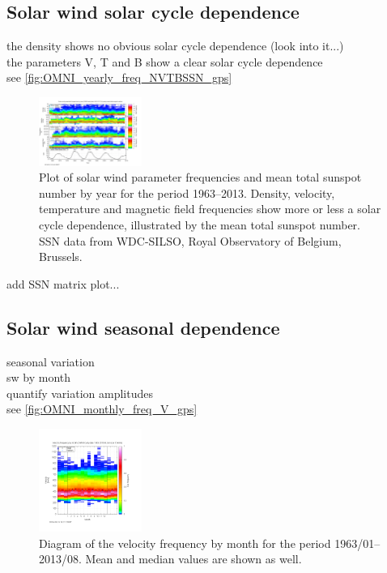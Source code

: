 \subsection{Solar wind solar cycle dependence}


the density shows no obvious solar cycle dependence (look into it...)\\
the parameters V, T and B show a clear solar cycle dependence\\
see \autoref{fig:OMNI_yearly_freq_NVTBSSN_gps}
\begin{figure}[htb]
	\centering
	\includegraphics[width=0.3\textwidth]{images/gnuplots/OMNI_yearly_freq_NVTBSSN_gps.png}
	\caption{Plot of solar wind parameter frequencies and mean total sunspot number by year for the period 1963--2013. Density, velocity, temperature and magnetic field frequencies show more or less a solar cycle dependence, illustrated by the mean total sunspot number. SSN data from WDC-SILSO, Royal Observatory of Belgium, Brussels.}
	\label{fig:OMNI_yearly_freq_NVTBSSN_gps}
\end{figure}
add SSN matrix plot...\\


\subsection{Solar wind seasonal dependence}

seasonal variation\\
sw by month\\
quantify variation amplitudes\\

see \autoref{fig:OMNI_monthly_freq_V_gps}
\begin{figure}[htb]
	\centering
	\includegraphics[width=0.3\textwidth]{images/gnuplots/OMNI_monthly_freq_V_gps.png}
	\caption{Diagram of the velocity frequency by month for the period 1963/01--2013/08. Mean and median values are shown as well.}
	\label{fig:OMNI_monthly_freq_V_gps}
\end{figure}


